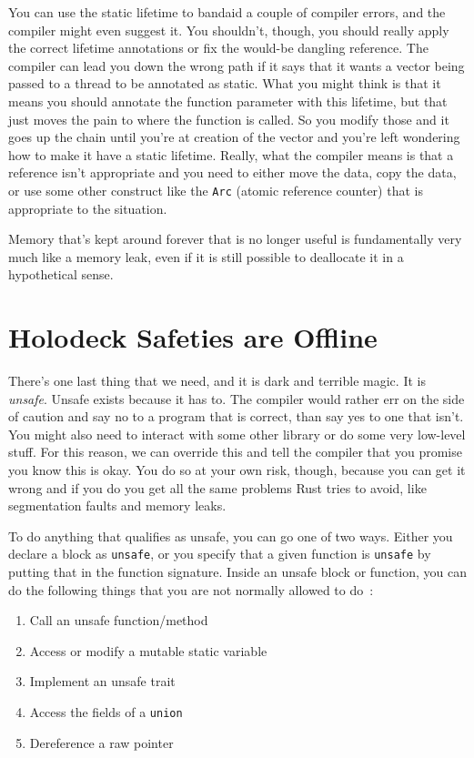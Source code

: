 \documentclass[a4paper]{report}
\begin{document}
You can use the static lifetime to bandaid a couple of compiler errors, and the compiler might even suggest it. You shouldn't, though, you should really apply the correct lifetime annotations or fix the would-be dangling reference. The compiler can lead you down the wrong path if it says that it wants a vector being passed to a thread to be annotated as static. What you might think is that it means you should annotate the function parameter with this lifetime, but that just moves the pain to where the function is called. So you modify those and it goes up the chain until you're at creation of the vector and you're left wondering how to make it have a static lifetime. Really, what the compiler means is that a reference isn't appropriate and you need to either move the data, copy the data, or use some other construct like the \texttt{Arc} (atomic reference counter) that is appropriate to the situation. 

Memory that's kept around forever that is no longer useful is fundamentally very much like a memory leak, even if it is still possible to deallocate it in a hypothetical sense.

\section*{Holodeck Safeties are Offline}
There's one last thing that we need, and it is dark and terrible magic. It is \textit{unsafe}. Unsafe exists because it has to. The compiler would rather err on the side of caution and say no to a program that is correct, than say yes to one that isn't. You might also need to interact with some other library or do some very low-level stuff. For this reason, we can override this and tell the compiler that you promise you know this is okay. You do so at your own risk, though, because you can get it wrong and if you do you get all the same problems Rust tries to avoid, like segmentation faults and memory leaks.

To do anything that qualifies as unsafe, you can go one of two ways. Either you declare a block as \texttt{unsafe}, or you specify that a given function is \texttt{unsafe} by putting that in the function signature. Inside an unsafe block or function, you can do the following things that you are not normally allowed to do~\cite{rustdocs}:

\begin{enumerate}
	\item Call an unsafe function/method
	\item Access or modify a mutable static variable
	\item Implement an unsafe trait
	\item Access the fields of a \texttt{union}
	\item Dereference a raw pointer
\end{enumerate}
\end{document}
